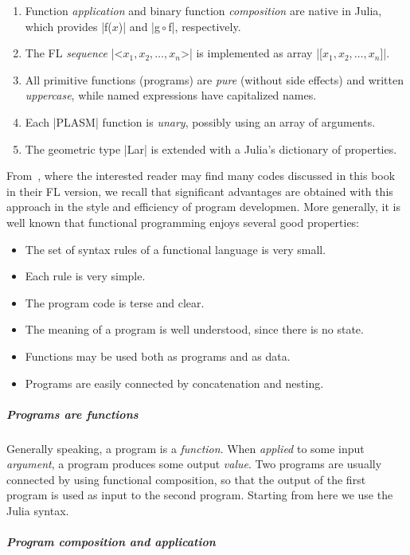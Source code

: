 \begin{enumerate}
\item Function \emph{application} and binary function \emph{composition} are native in Julia, which provides  |f($x$)| and  |g${}\circ{}$f|, respectively.
\item The FL \emph{sequence} |<$x_1, x_2, \ldots, x_n$>| is implemented as array |[$x_1, x_2, \ldots, x_n$]|.
\item All primitive functions (programs) are \emph{pure} (without side effects) and written \emph{uppercase}, while named expressions have capitalized names. 
\item Each |PLASM| function is \emph{unary}, possibly using an array of arguments. 
\item The geometric type |Lar| is extended with a Julia’s dictionary of properties.
\end{enumerate}


From~\cite{Paoluzzi2003a}, where the interested reader may find many codes discussed in this book in their FL version,  we recall that significant advantages are obtained with this approach in the style and efficiency of program developmen.
More generally, it is well known that functional programming enjoys several good properties:

\begin{itemize}
\item 
The set of syntax rules of a functional language is very small.
\item 
Each rule is very simple.
\item 
The program code is terse and clear.
\item 
The meaning of a program is well understood, since there is no state. 
\item 
Functions may be used both as programs and as data.
\item 
Programs are easily connected by concatenation and nesting.
\end{itemize}

\subparagraph{Programs are functions}

Generally speaking, a program is a \textit{function}.  When
\emph{applied} to some input \textit{argument}, a program
produces some output \textit{value}.  Two programs are usually
connected by using functional composition, so that the output of the
first program is used as input to the second program. Starting from here we use the Julia syntax.

\subparagraph{Program composition and application}

